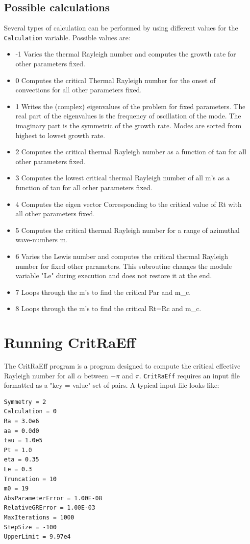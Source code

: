 \documentclass[a4paper,10pt]{book}
\begin{document}
\subsection{Possible calculations}
\label{s:possibleCalcs}
Several types of calculation can be performed by using different values for the 
\verb|Calculation| variable. Possible values are:
\begin{itemize}
\item{-1} Varies the thermal Rayleigh number and computes the growth rate for other parameters fixed.
\item{0} Computes the critical Thermal Rayleigh number for the onset of convections for all other parameters fixed.
\item{1} Writes the (complex) eigenvalues of the problem for fixed parameters. The real part of the eigenvalues is the frequency of oscillation of the mode. The imaginary part is the symmetric of the growth rate. Modes are sorted from highest to lowest growth rate.
\item{2} Computes the critical thermal Rayleigh number as a function of tau for all other parameters fixed.
\item{3} Computes the lowest critical thermal Rayleigh number of all m's as a function of tau for all other parameters fixed.
\item{4} Computes the eigen vector Corresponding to the critical value of Rt with all other parameters fixed.
\item{5} Computes the critical thermal Rayleigh number for a range of azimuthal wave-numbers m.
\item{6} Varies the Lewis number and computes the critical thermal Rayleigh number for fixed other parameters. This subroutine changes the module variable "Le" during execution and does not restore it at the end.
\item{7} Loops through the m's to find the critical Par and m\_c.
\item{8} Loops through the m's to find the critical Rt=Rc and m\_c. 
\end{itemize}

\section{Running CritRaEff}
The CritRaEff program is a program designed to compute the critical effective 
Rayleigh number for all $\alpha$ between $-\pi$ and $\pi$. 
\verb|CritRaEff| requires an input file formatted as a "key =  value" set of pairs.
A typical input file looks like:
\begin{verbatim}
Symmetry = 2
Calculation = 0
Ra = 3.0e6
aa = 0.0d0
tau = 1.0e5 
Pt = 1.0 
eta = 0.35 
Le = 0.3 
Truncation = 10 
m0 = 19
AbsParameterError = 1.00E-08 
RelativeGRError = 1.00E-03 
MaxIterations = 1000
StepSize = -100 
UpperLimit = 9.97e4
\end{verbatim}
\end{document}
